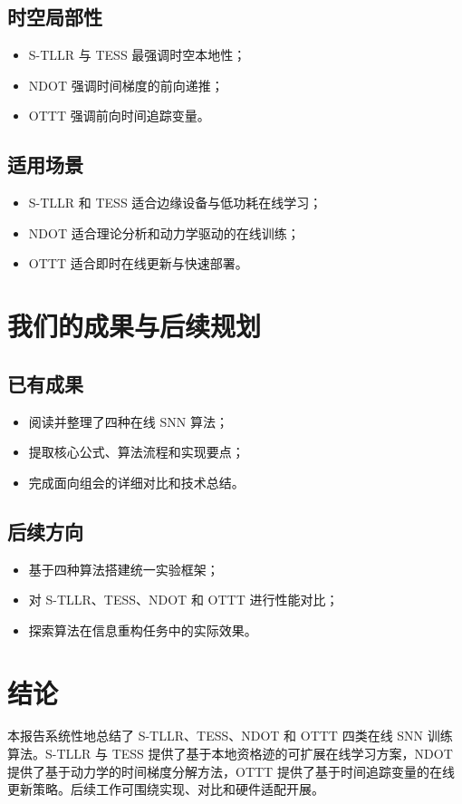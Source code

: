 \documentclass[journal,12pt,onecolumn]{IEEEtran}
\begin{document}
\subsection{时空局部性}
\begin{itemize}
  \item S-TLLR 与 TESS 最强调时空本地性；
  \item NDOT 强调时间梯度的前向递推；
  \item OTTT 强调前向时间追踪变量。
\end{itemize}

\subsection{适用场景}
\begin{itemize}
  \item S-TLLR 和 TESS 适合边缘设备与低功耗在线学习；
  \item NDOT 适合理论分析和动力学驱动的在线训练；
  \item OTTT 适合即时在线更新与快速部署。
\end{itemize}

\section{我们的成果与后续规划}
\subsection{已有成果}
\begin{itemize}
  \item 阅读并整理了四种在线 SNN 算法；
  \item 提取核心公式、算法流程和实现要点；
  \item 完成面向组会的详细对比和技术总结。
\end{itemize}

\subsection{后续方向}
\begin{itemize}
  \item 基于四种算法搭建统一实验框架；
  \item 对 S-TLLR、TESS、NDOT 和 OTTT 进行性能对比；
  \item 探索算法在信息重构任务中的实际效果。
\end{itemize}

\section{结论}
本报告系统性地总结了 S-TLLR、TESS、NDOT 和 OTTT 四类在线 SNN 训练算法。S-TLLR 与 TESS 提供了基于本地资格迹的可扩展在线学习方案，NDOT 提供了基于动力学的时间梯度分解方法，OTTT 提供了基于时间追踪变量的在线更新策略。后续工作可围绕实现、对比和硬件适配开展。



\end{document}
